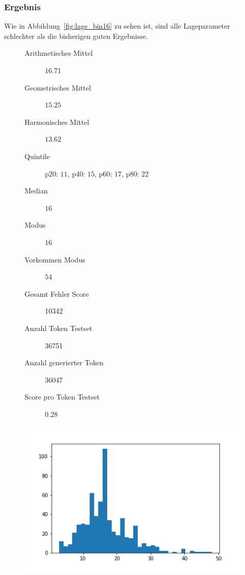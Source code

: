 \documentclass[pdftex,a4paper,halfparskip, article]{scrartcl}
\begin{document}
\subsubsection*{Ergebnis}


Wie in Abbildung~\ref{fig:lage_bin16} zu sehen ist, sind alle Lageparameter schlechter als die bisherigen guten Ergebnisse.

\begin{figure}
\centering
\begin{minipage}{.5\textwidth}
  \centering
  \begin{description}
	\item[Arithmetisches Mittel] $16.71$	
	\item[Geometrisches Mittel] $15.25$
	\item[Harmonisches Mittel] $13.62$
	\item[Quintile] p20: $11$, p40: $15$, p60: $17$, p80: $22$
	\item[Median] $16$
	\item[Modus] $16$
	\item[Vorkommen Modus] $54$
	\item[Gesamt Fehler Score] 10342
	\item[Anzahl Token Testset] 36751 
	\item[Anzahl generierter Token] 36047
	\item[Score pro Token Testset]  0.28
\end{description}
  \label{fig:lage_bin16}
\end{minipage}%
\begin{minipage}{.5\textwidth}
  \centering
  \includegraphics[width=1\linewidth]{predictions_bin16_histogramm}
  \label{fig:hist_bin16}
\end{minipage}
\end{figure}
\end{document}
